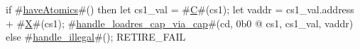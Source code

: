 if #\hyperref[sailRISCVzhaveAtomics]{haveAtomics}#() then {
  let cs1_val = #\hyperref[sailRISCVzC]{C}#(cs1);
  let vaddr = cs1_val.address + #\hyperref[sailRISCVzX]{X}#(cs1);
  #\hyperref[sailRISCVzhandlezyloadreszycapzyviazycap]{handle\_loadres\_cap\_via\_cap}#(cd, 0b0 @ cs1, cs1_val, vaddr)
} else {
  #\hyperref[sailRISCVzhandlezyillegal]{handle\_illegal}#();
  RETIRE_FAIL
}
